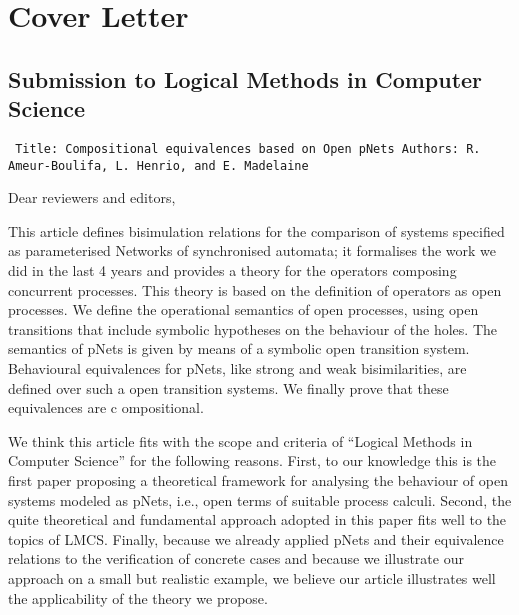 \documentclass[10pt]{article}
\newenvironment{ttbox}{\begin{alltt}\small\tt}%
                      {\end{alltt}}
\begin{document}
\section*{Cover Letter }
\subsection*{Submission to Logical Methods in Computer Science}
\medskip
\begin{ttbox}
Title: Compositional equivalences based on Open pNets
Authors: R. Ameur-Boulifa, L. Henrio, and E. Madelaine
\end{ttbox}
\bigskip
Dear reviewers and editors,

\medskip
This article defines bisimulation relations  for the comparison of systems specified as parameterised Networks of synchronised automata; it formalises the work we did in the last 4 years and provides a theory for the operators composing concurrent processes. This theory is based on the definition of operators as open processes. We define the operational semantics of open processes, using open transitions that include symbolic hypotheses on the behaviour of the holes. The  semantics of pNets is given by means of a symbolic open transition system. Behavioural equivalences for pNets, like strong and weak bisimilarities, are defined over such a open transition systems. We finally prove that these equivalences are c
ompositional.



\smallskip

We think this article fits with the scope and criteria of ``Logical Methods in Computer Science'' for the following reasons. First, to our knowledge this is the first paper proposing a theoretical framework for analysing the behaviour of open systems modeled as pNets, i.e., open terms of suitable process calculi.
Second, the quite theoretical and fundamental approach adopted in this paper fits well to the topics of LMCS.
Finally, because we already applied pNets and their equivalence relations to the verification of concrete cases and because we illustrate our approach on a small but realistic example, we believe our article illustrates well the applicability of the theory we propose.




\smallskip
\end{document}
